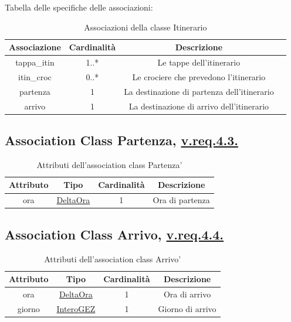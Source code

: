 \documentclass{article}
\begin{document}
Tabella delle specifiche delle associazioni:
\begin{table}[h!]
    \centering
    \begin{tabular}{|c|c|c|c|}
        \hline
        Associazione & Cardinalità & Descrizione \\
        \hline
        tappa\_itin & 1..* & Le tappe dell'itinerario \\
        itin\_croc & 0..* & Le crociere che prevedono l'itinerario \\
        partenza & 1 & La destinazione di partenza dell'itinerario \\
        arrivo & 1 & La destinazione di arrivo dell'itinerario \\
        \hline
    \end{tabular}
    \caption{Associazioni della classe Itinerario} 
\end{table}

\subsection*{Association Class Partenza, \hyperref[sec:RequisitiItinerarioDestinazioneDiPartenza]{v.req.4.3.}}

\begin{table}[h!]
    \centering
    \begin{tabular}{|c|c|c|c|}
        \hline
        Attributo & Tipo & Cardinalità & Descrizione \\
        \hline
        ora & \hyperref[sec:DeltaOra]{DeltaOra} & 1 & Ora di partenza \\
        \hline
    \end{tabular}
    \caption{Attributi dell'association class Partenza'}
\end{table}

\subsection*{Association Class Arrivo, \hyperref[sec:RequisitiItinerarioDestinazioneDiArrivo]{v.req.4.4.}}

\begin{table}[h!]
    \centering
    \begin{tabular}{|c|c|c|c|}
        \hline
        Attributo & Tipo & Cardinalità & Descrizione \\
        \hline
        ora & \hyperref[sec:DeltaOra]{DeltaOra} & 1 & Ora di arrivo \\
        giorno & \hyperref[sec:InteroGEZ]{InteroGEZ} & 1 & Giorno di arrivo \\
        \hline
    \end{tabular}
    \caption{Attributi dell'association class Arrivo'}
\end{table}
\end{document}
